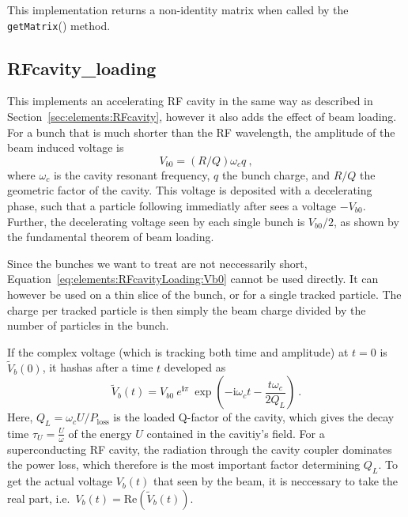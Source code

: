 \documentclass[a4paper]{report}
\begin{document}
This implementation returns a non-identity matrix when called by the \texttt{get\-Matrix}() method.


\subsection{RFcavity\_loading}

This implements an accelerating RF cavity in the same way as described in Section~\ref{sec:elements:RFcavity}, however it also adds the effect of beam loading.
For a bunch that is much shorter than the RF wavelength, the amplitude of the beam induced voltage is 
\begin{equation}
  V_{b0} = (R/Q) \omega_c q~,
  \label{eq:elements:RFcavityLoading:Vb0}
\end{equation}
where $\omega_c$ is the cavity resonant frequency, $q$ the bunch charge, and $R/Q$ the geometric factor of the cavity.
This voltage is deposited with a decelerating phase, such that a particle following immediatly after sees a voltage $-V_{b0}$.
Further, the decelerating voltage seen by each single bunch is $V_{b0}/2$, as shown by the fundamental theorem of beam loading.

Since the bunches we want to treat are not neccessarily short, Equation~\eqref{eq:elements:RFcavityLoading:Vb0} cannot be used directly.
It can however be used on a thin slice of the bunch, or for a single tracked particle.
The charge per tracked particle is then simply the beam charge divided by the number of particles in the bunch.

If the complex voltage (which is tracking both time and amplitude) at $t=0$ is $\tilde V_b(0)$, it hashas after a time $t$ developed as
\begin{equation}
  \tilde V_b(t) =  V_{b0} ~ e^{\mathbf{i}\pi} ~ \exp\left(-\mathrm{i}\omega_ct - \frac{t \omega_c}{2Q_L} \right)~.
  \label{eq:elements:RFcavityLoading:VbProp}
\end{equation}
Here, $Q_L = \omega_c U / P_\mathrm{loss}$ is the loaded Q-factor of the cavity, which gives the decay time $\tau_U = \frac{U}{\omega}$ of the energy $U$ contained in the cavitiy's field.
For a superconducting RF cavity, the radiation through the cavity coupler dominates the power loss, which therefore is the most important factor determining $Q_L$.
To get the actual voltage $V_b(t)$ that seen by the beam, it is neccessary to take the real part, i.e.\ $V_b(t) = \mathrm{Re}\left(\tilde V_b(t) \right)$.
\end{document}

